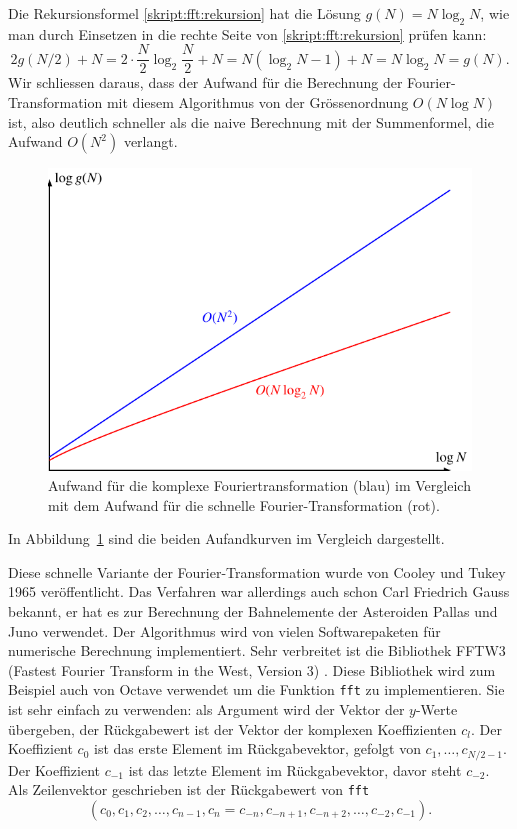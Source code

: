 Die Rekursionsformel
\eqref{skript:fft:rekursion}
hat die Lösung $g(N) = N\log_2 N$, wie man durch Einsetzen in die
rechte Seite von
\eqref{skript:fft:rekursion}
prüfen kann:
\[
2g(N/2) + N
=
2\cdot\frac{N}2\log_2\frac{N}2 + N
=
N(\log_2 N - 1) + N
=
N\log_2 N
=
g(N).
\]
Wir schliessen daraus, dass der Aufwand für die Berechnung der
Fourier-Transformation mit diesem Algorithmus von der Grössenordnung
$O(N\log N)$ ist, also deutlich schneller als die naive Berechnung
mit der Summenformel, die Aufwand $O(N^2)$ verlangt.
\begin{figure}
\centering
\includegraphics{chapters/6/fftaufwand.pdf}
\caption{Aufwand für die komplexe Fouriertransformation ({\color{blue}blau})
im Vergleich mit
dem Aufwand für die schnelle Fourier-Transformation ({\color{red}rot}).
\label{skript:fft:aufwandgraph}}
\end{figure}
In Abbildung~\ref{skript:fft:aufwandgraph} sind die beiden Aufandkurven im 
Vergleich dargestellt.

Diese schnelle Variante der Fourier-Transformation wurde von Cooley 
%
und Tukey 1965 veröffentlicht.
%
Das Verfahren war allerdings auch schon Carl Friedrich Gauss bekannt,
er hat es zur Berechnung der Bahnelemente der Asteroiden Pallas und
Juno verwendet.
Der Algorithmus wird von vielen Softwarepaketen für numerische Berechnung
implementiert.
Sehr verbreitet ist die Bibliothek FFTW3 (Fastest Fourier Transform in the
West, Version 3) \cite{skript:fftw}. 
Diese Bibliothek wird zum Beispiel auch von Octave verwendet um die
Funktion \texttt{fft} zu implementieren.
%
Sie ist sehr einfach zu verwenden: als Argument wird der Vektor der
$y$-Werte übergeben, der Rückgabewert ist der Vektor der komplexen
Koeffizienten $c_l$.
Der Koeffizient $c_0$ ist das erste Element im Rückgabevektor, gefolgt
von $c_1,\dots,c_{N/2-1}$.
Der Koeffizient $c_{-1}$ ist das letzte Element im Rückgabevektor, davor
steht $c_{-2}$.
Als Zeilenvektor geschrieben ist der Rückgabewert von \texttt{fft}
\[
( c_0, c_1, c_2, \dots , c_{n-1}, c_n=c_{-n},
c_{-n+1},c_{-n+2},\dots, c_{-2},c_{-1}).
\]


